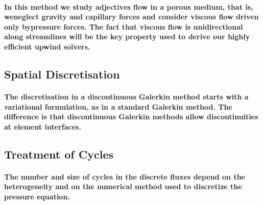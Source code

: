 \documentclass[a4paper,12pt]{article}
\begin{document}
\paragraph{In this method we study adjectives flow in a porous medium, that is, weneglect gravity and capillary forces and consider viscous flow driven only bypressure forces. The fact that viscous flow is unidirectional along streamlines
	will be the key property used to derive our highly efficient upwind solvers.}
\subsection{Spatial Discretisation}
\paragraph{The discretisation in a discontinuous Galerkin method starts with a variational formulation, as in a standard Galerkin method. The difference is that discontinuous Galerkin methods allow discontinuities
	at element interfaces.}
	
\subsection{Treatment of Cycles}
	\paragraph{The number and size of cycles in the discrete fluxes depend on the heterogeneity and on the numerical method used to discretize the pressure equation.}
	


\end{document}
